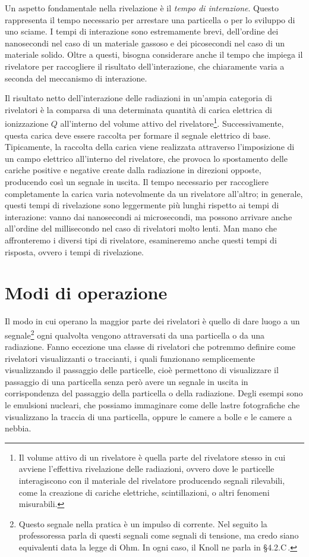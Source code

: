Un aspetto fondamentale nella rivelazione è il \textit{tempo di interazione}. Questo rappresenta il tempo necessario per arrestare una particella o per lo sviluppo di uno sciame. I tempi di interazione sono estremamente brevi, dell'ordine dei nanosecondi nel caso di un materiale gassoso e dei picosecondi nel caso di un materiale solido. Oltre a questi, bisogna considerare anche il tempo che impiega il rivelatore per raccogliere il risultato dell'interazione, che chiaramente varia a seconda del meccanismo di interazione.

Il risultato netto dell'interazione delle radiazioni in un'ampia categoria di rivelatori è la comparsa di una determinata quantità di carica elettrica di ionizzazione $Q$ all'interno del volume attivo del rivelatore\footnote{Il volume attivo di un rivelatore è quella parte del rivelatore stesso in cui avviene l'effettiva rivelazione delle radiazioni, ovvero dove le particelle interagiscono con il materiale del rivelatore producendo segnali rilevabili, come la creazione di cariche elettriche, scintillazioni, o altri fenomeni misurabili.}. Successivamente, questa carica deve essere raccolta per formare il segnale elettrico di base. Tipicamente, la raccolta della carica viene realizzata attraverso l'imposizione di un campo elettrico all'interno del rivelatore, che provoca lo spostamento delle cariche positive e negative create dalla radiazione in direzioni opposte, producendo così un segnale in uscita. Il tempo necessario per raccogliere completamente la carica varia notevolmente da un rivelatore all'altro; in generale, questi tempi di rivelazione sono leggermente più lunghi rispetto ai tempi di interazione: vanno dai nanosecondi ai microsecondi, ma possono arrivare anche all'ordine del millisecondo nel caso di rivelatori molto lenti. Man mano che affronteremo i diversi tipi di rivelatore, esamineremo anche questi tempi di risposta, ovvero i tempi di rivelazione.

\section{Modi di operazione}

Il modo in cui operano la maggior parte dei rivelatori è quello di dare luogo a un segnale\footnote{Questo segnale nella pratica è un impulso di corrente. Nel seguito la professoressa parla di questi segnali come segnali di tensione, ma credo siano equivalenti data la legge di Ohm. In ogni caso, il Knoll ne parla in \S4.2.C\,.} ogni qualvolta vengono attraversati da una particella o da una radiazione. Fanno eccezione una classe di rivelatori che potremmo definire come rivelatori visualizzanti o traccianti, i quali funzionano semplicemente visualizzando il passaggio delle particelle, cioè permettono di visualizzare il passaggio di una particella senza però avere un segnale in uscita in corrispondenza del passaggio della particella o della radiazione. Degli esempi sono le emulsioni nucleari, che possiamo immaginare come delle lastre fotografiche che visualizzano la traccia di una particella, oppure le camere a bolle e le camere a nebbia.

